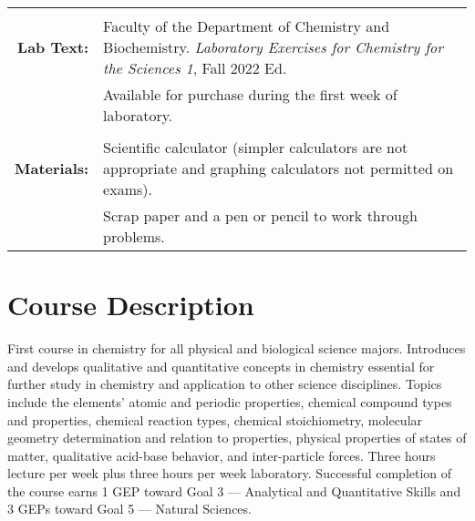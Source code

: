 \documentclass[11pt,letterpaper]{article}
\begin{document}
\begin{tabularx}{\linewidth} {@{\qquad}>{\bfseries\sffamily}r
	>{\raggedright\arraybackslash}X@{\qquad}}
	      \\ \\
	Lab Text: & Faculty of the Department of Chemistry and
	Biochemistry. \textit{Laboratory Exercises for Chemistry for
			      the Sciences 1}, Fall 2022 Ed. \\
	       	      & \footnotesize Available for purchase during the first
		      week of laboratory. \\ \\
	Materials: & Scientific calculator (simpler calculators
	are not appropriate and graphing calculators not permitted on exams). \\
		   & Scrap paper and a pen or pencil to work through problems.
		   \\
	\bottomrule
\end{tabularx}

\section{Course Description}
First course in chemistry for all physical and biological science majors.
Introduces and develops qualitative and quantitative concepts in chemistry
essential for further study in chemistry and application to other science
disciplines. Topics include the elements' atomic and periodic properties,
chemical compound types and properties, chemical reaction types, chemical
stoichiometry, molecular geometry determination and relation to properties,
physical properties of states of matter, qualitative acid-base behavior, and
inter-particle forces. Three hours lecture per week plus three hours per week
laboratory. Successful completion of the course earns 1 GEP toward Goal 3 ---
Analytical and Quantitative Skills and 3 GEPs toward Goal 5 --- Natural
Sciences.
\end{document}
